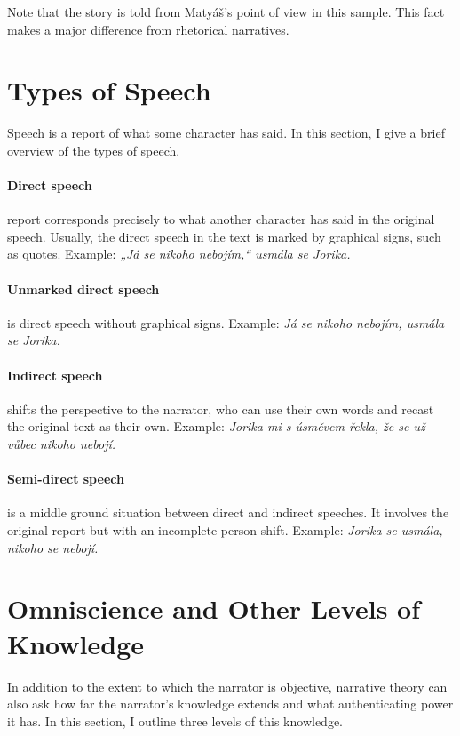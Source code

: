 Note that the story is told from Matyáš's point of view in this sample. This fact makes a major difference from rhetorical narratives.

\section{Types of Speech} \label{sec:speeches}

Speech is a report of what some character has said. In this section, I give a brief overview of the types of speech.

\paragraph{Direct speech} report corresponds precisely to what another character has said in the original speech. \cite{ChapterNine} Usually, the direct speech in the text is marked by graphical signs, such as quotes. Example: \emph{„Já se nikoho nebojím,“ usmála se Jorika.}

\paragraph{Unmarked direct speech} is direct speech without graphical signs. Example: \emph{Já se nikoho nebojím, usmála se Jorika.}

\paragraph{Indirect speech} shifts the perspective to the narrator, who can use their own words and recast the original text as their own. \cite{ChapterNine} Example: \emph{Jorika mi s úsměvem řekla, že se už vůbec nikoho nebojí.}

\paragraph{Semi-direct speech} is a middle ground situation between direct and indirect speeches. It involves the original report but with an incomplete person shift. \cite{ChapterNine} Example: \emph{Jorika se usmála, nikoho se nebojí.}

\section{Omniscience and Other Levels of Knowledge}

In addition to the extent to which the narrator is objective, narrative theory can also ask how far the narrator's knowledge extends and what authenticating power it has. In this section, I outline three levels of this knowledge.

